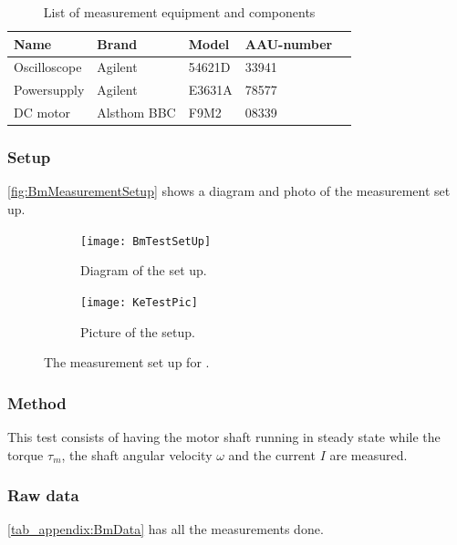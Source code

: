 \begin{table}[htbp]
	\centering
	\caption{List of measurement equipment and components}\label{tab_appendix:BmSetUp}
	
	\begin{tabularx}{\textwidth}{lXXXX}
		Name 				& Brand	& Model & AAU-number									\\ \toprule \rowcolor{lightGrey}
		Oscilloscope	& Agilent & 54621D & 33941 	\\
		Powersupply	& Agilent & E3631A & 78577\\ \rowcolor{lightGrey}
		DC motor & Alsthom BBC & F9M2& 08339
	\end{tabularx}
\end{table}

\subsubsection*{Setup}
\autoref{fig:BmMeasurementSetup} shows a diagram and photo of the measurement set up.
\begin{figure}[htbp]
	\centering
	\begin{subfigure}{0.50\textwidth}
		\texttt{[image: BmTestSetUp]}
		\caption{Diagram of the set up.} \label{fig:BmMeasurementDiagram}
	\end{subfigure}
	\begin{subfigure}{0.40\textwidth}
		\texttt{[image: KeTestPic]}
		\caption{Picture of the setup.} \label{fig:BmMeasurementPictures}
	\end{subfigure}
	\caption{The measurement set up for .} \label{fig:BmMeasurementSetup}   
\end{figure}

\subsubsection*{Method}
This test consists of having the motor shaft running in steady state while the torque $\tau_m$, the shaft angular velocity $\omega$ and the current $I$ are measured.

\subsubsection*{Raw data}
\autoref{tab_appendix:BmData} has all the measurements done.

